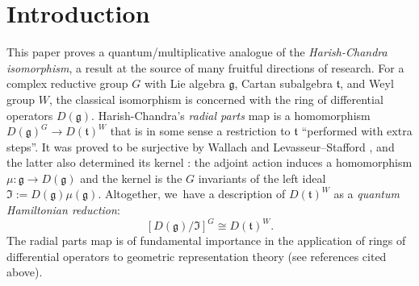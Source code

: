 \documentclass[JEP,XML,SOM,Unicode,published]{cedram}
\theoremstyle{definition}
\begin{document}
\section{Introduction}
This paper proves a quantum/multiplicative analogue of the \textit{Harish-Chandra isomorphism}, a result at the source of many fruitful directions of research.
For a complex reductive group $G$ with Lie algebra $\mathfrak{g}$, Cartan subalgebra $\mathfrak{t}$, and Weyl group $W$, the classical isomorphism is concerned with the ring of differential operators $D(\mathfrak{g})$.
Harish-Chandra's \textit{radial parts} map \cite{HCInvDiff} is a homomorphism $D(\mathfrak{g})^G\to D(\mathfrak{t})^W$ that is in some sense a restriction to $\mathfrak{t}$ ``performed with extra steps''.
It was proved to be surjective by Wallach \cite{WallachInv} and Levasseur--Stafford \cite{LevStafJams}, and the latter also determined its kernel \cite{LevStafKer}: the adjoint action induces a homomorphism $\mu:\mathfrak{g}\to D(\mathfrak{g})$ and the kernel is the $G$ invariants of the left ideal $\mathfrak{I}:= D(\mathfrak{g})\mu(\mathfrak{g})$.
Altogether, we~have a description of $D(\mathfrak{t})^W$ as a \textit{quantum Hamiltonian reduction}:
\[
\left[ D(\mathfrak{g})\big/\mathfrak{I} \right]^G\cong D(\mathfrak{t})^W.
\]
The radial parts map is of fundamental importance in the application of rings of differential operators to geometric representation theory (see references cited above).
\end{document}

